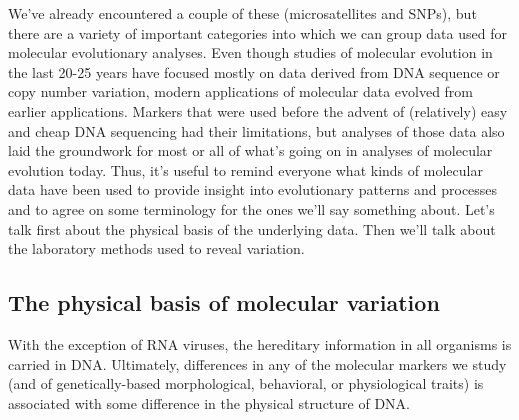 \documentclass[12pt]{article}
\begin{document}
We've already encountered a couple of these (microsatellites and
SNPs), but there are a variety of important categories into which we
can group data used for molecular evolutionary analyses. Even though
studies of molecular evolution in the last 20-25 years have focused
mostly on data derived from DNA sequence or copy number variation,
modern applications of molecular data evolved from earlier
applications. Markers that were used before the advent of (relatively)
easy and cheap DNA sequencing had their limitations, but analyses of
those data also laid the groundwork for most or all of what's going on
in analyses of molecular evolution today. Thus, it's useful to remind
everyone what kinds of molecular data have been used to provide
insight into evolutionary patterns and processes and to agree on some
terminology for the ones we'll say something about. Let's talk first
about the physical basis of the underlying data. Then we'll talk about
the laboratory methods used to reveal variation.

\subsection*{The physical basis of molecular variation}

With the exception of RNA viruses, the hereditary information in all
organisms is carried in DNA. Ultimately, differences in any of the
molecular markers we study (and of genetically-based morphological,
behavioral, or physiological traits) is associated with some
difference in the physical structure of DNA.
\end{document}
